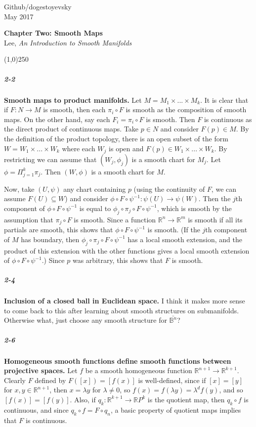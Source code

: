 \documentclass[10pt,letter]{article}
\begin{document}
\noindent Github/dogestoyevsky \\
May 2017
\begin{center}
\textbf{Chapter Two: Smooth Maps}\\ Lee, \textit{An Introduction to Smooth Manifolds}

\line(1,0){250}
\end{center}

\subparagraph{2-2} \textbf{Smooth maps to product manifolds.} Let $M = M_1 \times ... \times M_k$. It is clear that if $F: N \rightarrow M$ is smooth, then each $\pi_i \circ F$ is smooth as the composition of smooth maps. On the other hand, say each $F_i = \pi_i \circ F$ is smooth. Then $F$ is continuous as the direct product of continuous maps. Take $p \in N$ and consider $F(p) \in M$. By the definition of the product topology, there is an open subset of the form $W = W_1 \times... \times W_k$ where each $W_j$ is open and $F(p) \in W_1 \times... \times W_k$. By restricting we can assume that $(W_j,\phi_j)$ is a smooth chart for $M_j$. Let $\phi = \Pi_{j=1}^k \pi_j$. Then $(W,\phi)$ is a smooth chart for $M$.  

Now, take $(U,\psi)$ any chart containing $p$ (using the continuity of $F$, we can assume $F(U) \subseteq W$) and consider $\phi \circ F \circ \psi^{-1}: \psi(U) \rightarrow \psi(W)$.  Then the $j$th component of $\phi \circ F \circ \psi^{-1}$ is equal to $\phi_j \circ \pi_j \circ F \circ \psi^{-1}$, which is smooth by the assumption that $\pi_j \circ F$ is smooth. Since a function $\mathbb{R}^n \rightarrow \mathbb{R}^m$ is smooth if all its partials are smooth, this shows that $\phi \circ F \circ \psi^{-1}$ is smooth. (If the $j$th component of $M$ has boundary, then $\phi_j \circ \pi_j \circ F \circ \psi^{-1}$ has a local smooth extension, and the product of this extension with the other functions gives a local smooth extension of $\phi \circ F \circ \psi^{-1}$.) Since $p$ was arbitrary, this shows that $F$ is smooth.
 
\subparagraph{2-4} \textbf{Inclusion of a closed ball in Euclidean space.} I think it makes more sense to come back to this after learning about smooth structures on submanifolds. Otherwise what, just choose any smooth structure for $\bar{\mathbb{B}^n}$? 

\subparagraph{2-6} \textbf{Homogeneous smooth functions define smooth functions between projective spaces.} Let $f$ be a smooth homogeneous function $\mathbb{R}^{n+1} \rightarrow \mathbb{R}^{k+1}$. Clearly $F$ defined by $F([x]) = [f(x)]$ is well-defined, since if $[x] = [y]$ for $x, y \in \mathbb{R}^{n+1}$, then $x = \lambda y$ for $\lambda \neq 0$, so $f(x) = f(\lambda y) = \lambda^d f(y)$, and so $[f(x)] = [f(y)]$. Also, if $q_k: \mathbb{R}^{k+1} \rightarrow \mathbb{R}P^k$ is the quotient map, then $q_k \circ f$ is continuous, and since $q_k \circ f = F \circ q_n$, a basic property of quotient maps implies that $F$ is continuous. 
\end{document}
